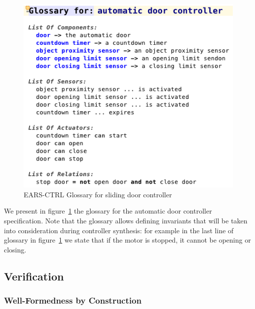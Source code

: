 \begin{figure}[h!]
   \begin{center}
     \includegraphics[width=.5\textwidth]{images/glossary.png}
     \caption{\textsf{EARS-CTRL} Glossary for sliding door
     controller}
     \label{fig:ears_glossary}
   \end{center}
 \end{figure}
 
 We present in figure~\ref{fig:ears_glossary} the glossary for the automatic
 door controller specification. Note that the glossary allows defining
 invariants that will be taken into consideration during controller synthesis:
 for example in the last line of glossary in figure~\ref{fig:ears_glossary} we
 state that if the motor is \textsf{stopped}, it cannot be \textsf{opening} or
 \textsf{closing}.

\subsection{Verification}


\subsubsection{Well-Formedness by Construction}

